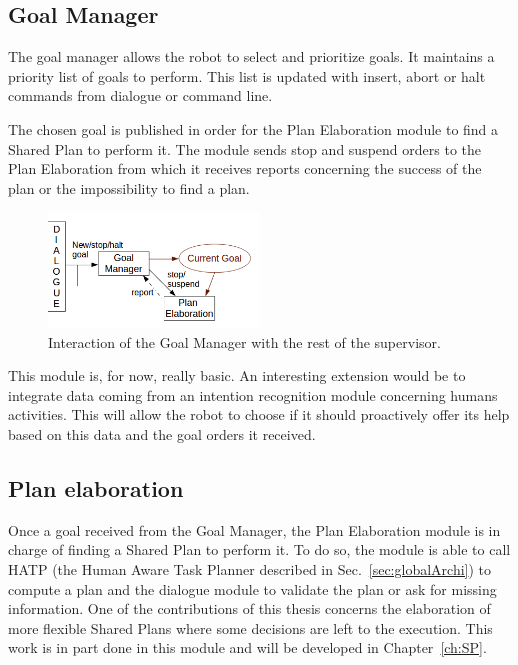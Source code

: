 \documentclass[english,a4paper,11pt,twoside]{StyleThese}
\begin{document}
\subsection{Goal Manager}

The goal manager allows the robot to select and prioritize goals. It maintains a priority list of goals to perform. This list is updated with insert, abort or halt commands from dialogue or command line.

The chosen goal is published in order for the Plan Elaboration module to find a Shared Plan to perform it. The module sends stop and suspend orders to the Plan Elaboration from which it receives reports concerning the success of the plan or the impossibility to find a plan.

\begin{figure}[!h]
	\centering
    \includegraphics[width=0.5\textwidth]{figs/Chapter2/GoalManager.png}
    \caption{Interaction of the Goal Manager with the rest of the supervisor.}
    \label{fig:goalManager}
\end{figure}

This module is, for now, really basic. An interesting extension would be to integrate data coming from an intention recognition module concerning humans activities. This will allow the robot to choose if it should proactively offer its help based on this data and the goal orders it received. 

\subsection{Plan elaboration}

Once a goal received from the Goal Manager, the Plan Elaboration module is in charge of finding a Shared Plan to perform it. To do so, the module is able to call HATP (the Human Aware Task Planner described in Sec.~\ref{sec:globalArchi}) to compute a plan and the dialogue module to validate the plan or ask for missing information. One of the contributions of this thesis concerns the elaboration of more flexible Shared Plans where some decisions are left to the execution. This work is in part done in this module and will be developed in Chapter~\ref{ch:SP}.
\end{document}
